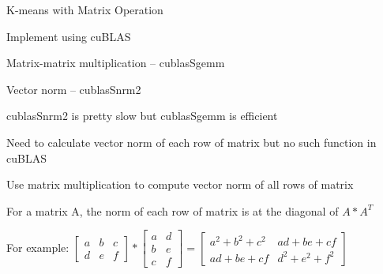 \documentclass[
nopagebreaks,
style=klope,
fleqn]{powerdot}
\begin{document}
\begin{slide}{K-means with Matrix Operation}
  \begin{compactitem}
  \item{Implement using cuBLAS}
  \item{Matrix-matrix multiplication -- cublasSgemm}
  \item{Vector norm -- cublasSnrm2}
  \item{cublasSnrm2 is pretty slow but cublasSgemm is efficient
    \begin{compactitem}
    \item{Need to calculate vector norm of each row of matrix but no such function in cuBLAS}
    \end{compactitem}
  }
  \item{Use matrix multiplication to compute vector norm of all rows of matrix
    \begin{compactitem}
    \item{For a matrix A, the norm of each row of matrix is at the diagonal of $A * A^T$}
    \item{For example: 
      $
      \begin{bmatrix}
        a & b & c\\
        d & e & f
      \end{bmatrix}
      *
      \begin{bmatrix}
        a & d \\
        b & e \\
        c & f
      \end{bmatrix}
      =
      \begin{bmatrix}
        a^2+b^2+c^2 & ad + be + cf \\
        ad + be + cf & d^2 + e^2 + f^2
      \end{bmatrix}
      $
    }  
    \end{compactitem}
  } 
  \end{compactitem}
\end{slide}
\end{document}

